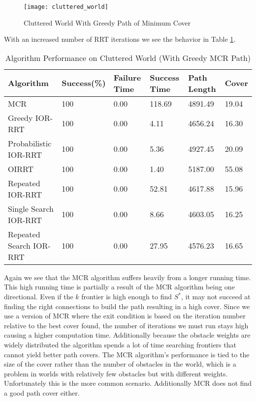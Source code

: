 \begin{figure}[h!]
    \centering
    \texttt{[image: cluttered\_world]}
    \caption{Cluttered World With Greedy Path of Minimum Cover}
    \label{fig:cluttered_world}
\end{figure}
With an increased number of RRT iterations we see the behavior in Table \ref{tab:cluttered_world}. 

\begin{table}
\begin{tabular}{@{}llllll@{}}
\toprule
Algorithm & Success(\%)  & Failure Time  & Success Time  & Path Length & Cover\\ 
\midrule
MCR & 100 & 0.00 & 118.69 & 4891.49 & 19.04 \\
Greedy IOR-RRT & 100 & 0.00 & 4.11 & 4656.24 & 16.30 \\
Probabilistic IOR-RRT & 100 & 0.00 & 5.36 & 4927.45 & 20.09 \\
OIRRT & 100 & 0.00 & 1.40 & 5187.00 & 55.08 \\
Repeated IOR-RRT & 100 & 0.00 & 52.81 & 4617.88 & 15.96 \\
Single Search IOR-RRT & 100 & 0.00 & 8.66 & 4603.05 & 16.25 \\
Repeated Search IOR-RRT & 100 & 0.00 & 27.95 & 4576.23 & 16.65 \\
\bottomrule
\end{tabular}
\caption{Algorithm Performance on Cluttered World (With Greedy MCR Path)}
\label{tab:cluttered_world}
\end{table}

Again we see that the MCR algorithm suffers heavily from a longer running time. This high running time is partially a result of the MCR algorithm being one directional. Even if the $k$ frontier is high enough to find $S^*$, it may not succeed at finding the right connections to build the path resulting in a high cover. Since we use a version of MCR where the exit condition is based on the iteration number relative to the best cover found, the number of iterations we must run stays high causing a higher computation time. Additionally because the obstacle weights are widely distributed the algorithm spends a lot of time searching frontiers that cannot yield better path covers. The MCR algorithm's performance is tied to the size of the cover rather than the number of obstacles in the world, which is a problem in worlds with relatively few obstacles but with different weights. Unfortunately this is the more common scenario. Additionally MCR does not find a good path cover either.


